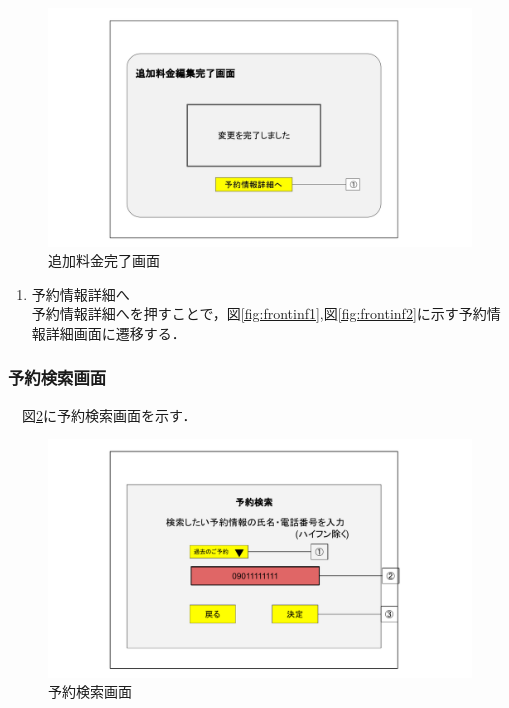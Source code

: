\begin{figure}[H]
 \centering
   \includegraphics[width=150mm]{UI_front/addfD.jpg}
 \caption{追加料金完了画面}
 \label{fig:frontFc}
\end{figure}

\begin{enumerate}
\renewcommand{\labelenumi}{\textcircled{\scriptsize \theenumi}}
\item 予約情報詳細へ\\ 予約情報詳細へを押すことで，図\ref{fig:frontinf1},図\ref{fig:frontinf2}に示す予約情報詳細画面に遷移する．
\end{enumerate}


\subsubsection{予約検索画面}
　図\ref{fig:frontS}に予約検索画面を示す．

\begin{figure}[H]
 \centering
   \includegraphics[width=120mm]{UI_front/Reservation-search-screen.pdf}
 \caption{予約検索画面}
 \label{fig:frontS}
\end{figure}

